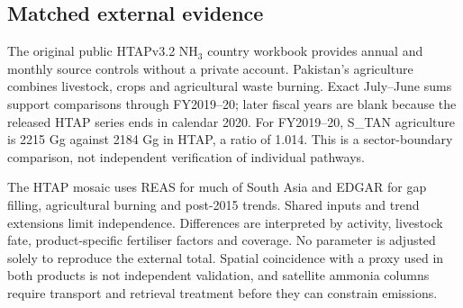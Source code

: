 \subsection{Matched external evidence}\label{sec:ap-benchmark}
The original public HTAPv3.2 NH$_3$ country workbook provides annual and monthly source controls without a private account. Pakistan's agriculture combines livestock, crops and agricultural waste burning. Exact July--June sums support comparisons through FY2019--20; later fiscal years are blank because the released HTAP series ends in calendar 2020. For FY2019--20, S\_TAN agriculture is 2215 Gg against 2184 Gg in HTAP, a ratio of 1.014. This is a sector-boundary comparison, not independent verification of individual pathways.

The HTAP mosaic uses REAS for much of South Asia and EDGAR for gap filling, agricultural burning and post-2015 trends. Shared inputs and trend extensions limit independence. Differences are interpreted by activity, livestock fate, product-specific fertiliser factors and coverage. No parameter is adjusted solely to reproduce the external total. Spatial coincidence with a proxy used in both products is not independent validation, and satellite ammonia columns require transport and retrieval treatment before they can constrain emissions.
